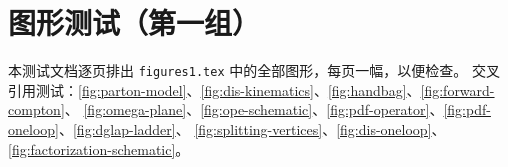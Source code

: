 
\usepackage{showframe}          %

\chapter{图形测试（第一组）}
本测试文档逐页排出 \texttt{figures1.tex} 中的全部图形，每页一幅，以便检查。
交叉引用测试：\cref{fig:parton-model}、\cref{fig:dis-kinematics}、\cref{fig:handbag}、\cref{fig:forward-compton}、
\cref{fig:omega-plane}、\cref{fig:ope-schematic}、\cref{fig:pdf-operator}、\cref{fig:pdf-oneloop}、\cref{fig:dglap-ladder}、
\cref{fig:splitting-vertices}、\cref{fig:dis-oneloop}、\cref{fig:factorization-schematic}。
\clearpage
\clearpage
\clearpage
\clearpage
\clearpage
\clearpage
\clearpage
\clearpage
\clearpage
\clearpage
\clearpage
\clearpage
\clearpage

